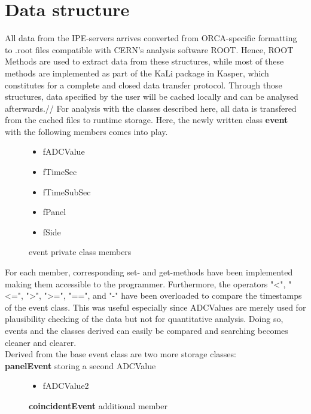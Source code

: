   \section{Data structure}
  \label{ch:Analysis software:sec:Data structure}
    All data from the IPE-servers arrives converted from ORCA-specific formatting to .root files compatible with CERN's analysis software ROOT. Hence, ROOT Methods are used to extract data from these structures, while most of these methods are implemented as part of the KaLi package in Kasper, which constitutes for a complete and closed data transfer protocol.
    Through those structures, data specified by the user will be cached locally and can be analysed afterwards.//
    For analysis with the classes described here, all data is transfered from the cached files to runtime storage. 
    Here, the newly written class {\bf event} with the following members comes into play.
    \begin{figure}[H]
      \caption*{event private class members}
      \begin{itemize}
	\item fADCValue
	\item fTimeSec
    	\item fTimeSubSec
    	\item fPanel
    	\item fSide
      \end{itemize}
    \end{figure}
    For each member, corresponding set- and get-methods have been implemented making them accessible to the programmer. Furthermore, the operators "<", "<=", ">", ">=", "==", and "-" have been overloaded to compare the timestamps of the event class. This was useful especially since ADCValues are merely used for plausibility checking of the data but not for quantitative analysis. Doing so, events and the classes derived can easily be compared and searching becomes cleaner and clearer.\\
    Derived from the base event class are two more storage classes:\\
    {\bf panelEvent} storing a second ADCValue
    \begin{figure}[H]
      \caption*{{\bf coincidentEvent} additional member}
      \begin{itemize}
	\item fADCValue2
      \end{itemize}
    \end{figure}
	
